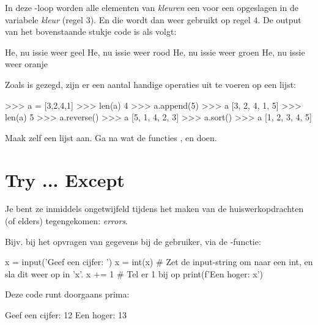 In deze -loop worden alle elementen van \textit{kleuren} een voor een opgeslagen in de variabele \textit{kleur} (regel $3$). En die wordt dan weer gebruikt op regel $4$. De output van het bovenstaande stukje code is als volgt:

\begin{python}
He, nu issie weer geel
He, nu issie weer rood
He, nu issie weer groen
He, nu issie weer oranje
\end{python}

Zoals is gezegd, zijn er een aantal handige operaties uit te voeren op een lijst:
\begin{python}
>>> a = [3,2,4,1]
>>> len(a)
4
>>> a.append(5)
>>> a
[3, 2, 4, 1, 5]
>>> len(a)
5
>>> a.reverse()
>>> a
[5, 1, 4, 2, 3]
>>> a.sort()
>>> a
[1, 2, 3, 4, 5]
\end{python}

\begin{exercise}
Maak zelf een lijst aan. Ga na wat de functies ,  en  doen. 
\end{exercise}



\section{Try ... Except}
Je bent ze inmiddels ongetwijfeld tijdens het maken van de huiswerkopdrachten (of elders) tegengekomen: \textit{errors}. 

Bijv. bij het opvragen van gegevens bij de gebruiker, via de -functie:
\begin{python}
x = input('Geef een cijfer: ')
x = int(x)  # Zet de input-string om naar een int, en sla dit weer op in 'x'.
x += 1  # Tel er 1 bij op
print(f'Een hoger: {x}')
\end{python}
Deze code runt doorgaans prima:
\begin{python}
Geef een cijfer: 12
Een hoger: 13
\end{python}

\newpage 

